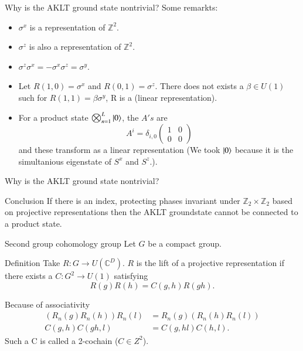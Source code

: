 \documentclass{beamer}
\newcommand{\CC}{\mathbb{C}}
\newcommand{\ZZ}{\mathbb{Z}}
\begin{document}
\begin{frame}{Why is the AKLT ground state nontrivial?}
Some remarkts:
\begin{itemize}
\item $\sigma^x$ is a representation of $\ZZ^2$.
\pause
\item $\sigma^z$ is also a representation of $\ZZ^2$.
\pause
\item $\sigma^z\sigma^x=-\sigma^x\sigma^z=\sigma^y$.
\pause
\item Let $R(1,0)=\sigma^x$ and $R(0,1)=\sigma^z$. There does not exists a $\beta\in U(1)$ such for $R(1,1)=\beta \sigma^y$, R is a (linear representation).
\pause
\item For a product state $\bigotimes_{n=1}^L\ket{0}$, the $A's$ are
\[A^i=\delta_{i,0}\begin{pmatrix}1&0\\0&0\end{pmatrix}\]
and these transform as a linear representation (We took $\ket{0}$ because it is the simultanious eigenstate of $S^x$ and $S^z$.).
\end{itemize}
\end{frame}

\begin{frame}{Why is the AKLT ground state nontrivial?}
\begin{block}{Conclusion}
If there is an index, protecting phases invariant under $\ZZ_2\times\ZZ_2$ based on projective representations then the AKLT groundstate cannot be connected to a product state.
\end{block}
\end{frame}

\begin{frame}{Second group cohomology group}
Let $G$ be a compact group.
\begin{block}{Definition}
Take $R:G\rightarrow U(\CC^D)$. $R$ is the lift of a projective representation if there exists a $C:G^2\rightarrow U(1)$ satisfying
\[R(g)R(h)=C(g,h)R(gh).\]
\end{block}
\pause
Because of associativity
\begin{align*}
(R_n(g)R_n(h))R_n(l)&=R_n(g)(R_n(h)R_n(l))\\
C(g,h)C(gh,l)&=C(g,hl)C(h,l).
\end{align*}
Such a C is called a 2-cochain ($C\in Z^2$).
\end{frame}
\end{document}
